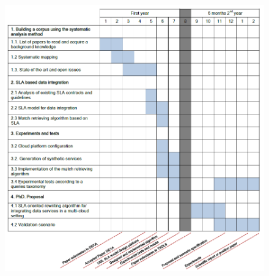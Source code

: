 \documentclass[11pt,a4paper,oneside]{report}
\begin{document}
\begin{figure}[!b]
\center
\includegraphics[scale=0.37]{calendario.png}
\end{figure}



\end{document}

